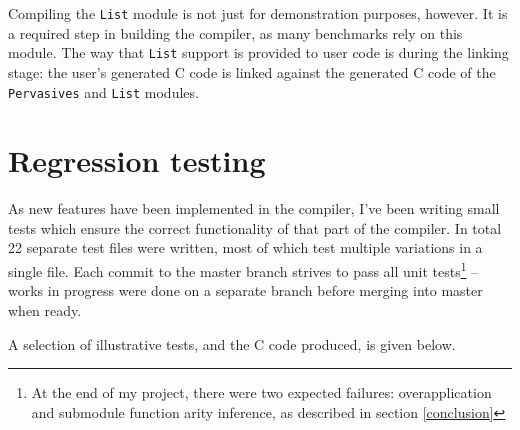 \documentclass[12pt,a4paper,twoside,openright]{report}
\begin{document}
Compiling the \lstinline!List! module is not just for demonstration purposes,
however. It is a required step in building the compiler, as many benchmarks
rely on this module. The way that \lstinline!List! support is provided to user
code is during the linking stage: the user's generated C code is linked
against the generated C code of the \lstinline!Pervasives! and \lstinline!List!
modules.

\section{Regression testing}\label{regression-testing}

As new features have been implemented in the compiler, I've been writing small
tests which ensure the correct functionality of that part of the compiler. In
total 22 separate test files were written, most of which test multiple
variations in a single file. Each commit to the master branch strives to pass
all unit tests\footnote{At the end of my project, there were two expected
  failures: overapplication and submodule function arity inference, as
  described in section \ref{conclusion}}
-- works in progress were done on a separate branch before merging into master
when ready.

A selection of illustrative tests, and the C code produced, is given below.
\end{document}
